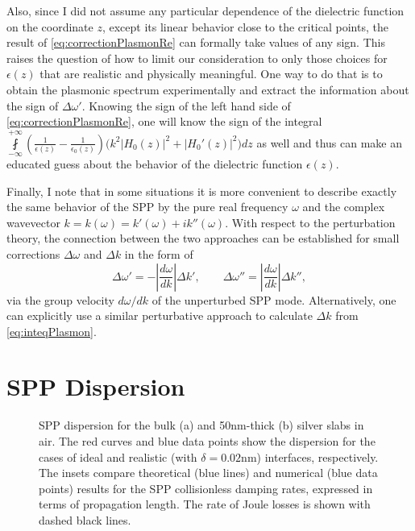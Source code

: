 Also, since I did not assume any particular dependence of the dielectric function on the coordinate $z$, except its linear behavior close to the critical points, the result of \cref{eq:correctionPlasmonRe} can formally take values of any sign.
This raises the question of how to limit our consideration to only those choices for $\epsilon(z)$ that are realistic and physically meaningful.
One way to do that is to obtain the plasmonic spectrum experimentally and extract the information about the sign of $\Delta\omega'$.
Knowing the sign of the left hand side of \cref{eq:correctionPlasmonRe}, one will know the sign of the integral $\fint\limits_{-\infty}^{+\infty}\left(\frac{1}{\epsilon(z)}-\frac{1}{\epsilon_0(z)}\right) \Big(k^2|H_0(z)|^2+|H_0'(z)|^2\Big)dz$ as well and thus can make an educated guess about the behavior of the dielectric function $\epsilon(z)$.

Finally, I note that in some situations it is more convenient to describe exactly the same behavior of the SPP by the pure real frequency $\omega$ and the complex wavevector $k=k(\omega)=k'(\omega)+ik''(\omega)$.
With respect to the perturbation theory, the connection between the two approaches can be established for small corrections $\Delta\omega$ and $\Delta k$ in the form of
\begin{equation}
\label{eq:omegatokPlasmon}
\Delta\omega'=-\left|\frac{d\omega}{dk}\right|\Delta k', \qquad
\Delta\omega''=\left|\frac{d\omega}{dk}\right|\Delta k'',
\end{equation}
via the group velocity $d\omega/dk$ of the unperturbed SPP mode.
Alternatively, one can explicitly use a similar perturbative approach to calculate $\Delta k$ from \cref{eq:inteqPlasmon}.

\section{SPP Dispersion}

\begin{figure}[ptb]

\caption{SPP dispersion for the bulk (a) and 50nm-thick (b) silver slabs in air. The red curves and blue data points show the dispersion for the cases of ideal and realistic (with $\delta=0.02$nm) interfaces, respectively. The insets compare theoretical (blue lines) and numerical (blue data points) results for the SPP collisionless damping rates, expressed in terms of propagation length. The rate of Joule losses is shown with dashed black lines.}
\label{fig:dispersionPlasmon}
\end{figure}

